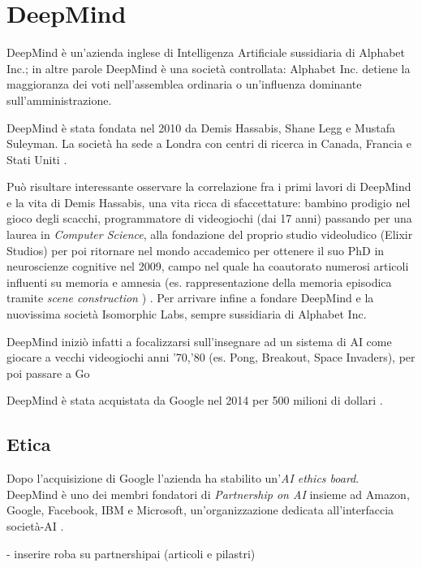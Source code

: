 \section{DeepMind}

DeepMind è un'azienda inglese di Intelligenza Artificiale sussidiaria di Alphabet Inc.; in altre parole DeepMind è una società controllata: Alphabet Inc. detiene la maggioranza dei voti nell'assemblea ordinaria o un'influenza dominante sull'amministrazione.

\par DeepMind è stata fondata nel 2010 da Demis Hassabis, Shane Legg e Mustafa Suleyman. La società ha sede a Londra con centri di ricerca in Canada, Francia e Stati Uniti \cite{deepMindWiki}.

Può risultare interessante osservare la correlazione fra i primi lavori di DeepMind e la vita di Demis Hassabis, una vita ricca di sfaccettature: bambino prodigio nel gioco degli scacchi, programmatore di videogiochi (dai 17 anni) passando per una laurea in \textit{Computer Science}, alla fondazione del proprio studio videoludico (Elixir Studios) per poi ritornare nel mondo accademico per ottenere il suo PhD in neuroscienze cognitive nel 2009, campo nel quale ha coautorato numerosi articoli influenti su memoria e amnesia (es. rappresentazione della memoria episodica tramite \textit{scene construction} \cite{Hassabis2007Jul}) \cite{hassabisWiki}. Per arrivare infine a fondare DeepMind e la nuovissima società Isomorphic Labs, sempre sussidiaria di Alphabet Inc.

\par DeepMind iniziò infatti a focalizzarsi sull'insegnare ad un sistema di AI come giocare a vecchi videogiochi anni '70,'80 (es. Pong, Breakout, Space Invaders), per poi passare a Go

DeepMind è stata acquistata da Google nel 2014 per 500 milioni di dollari \cite{Guardian2014}.

\subsection{Etica}
Dopo l'acquisizione di Google l'azienda ha stabilito un'\textit{AI ethics board}.\\
DeepMind è uno dei membri fondatori di \textit{Partnership on AI} insieme ad Amazon, Google, Facebook, IBM e Microsoft, un'organizzazione dedicata all'interfaccia società-AI \cite{partnershiponai}.

- inserire roba su partnershipai (articoli e pilastri)

